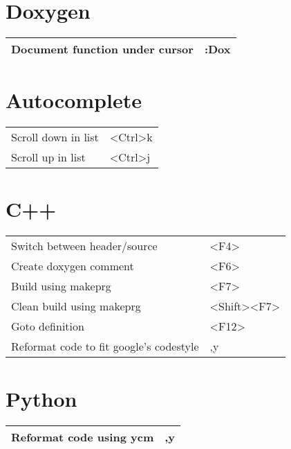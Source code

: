 \documentclass[a4paper]{report}
\def \tablewidth {10cm}
\begin{document}
\section{Doxygen}
\begin{tabularx}{\tablewidth}{| X | l |}
  \hline
  Document function under cursor & :Dox \\
  \hline
\end{tabularx}

\section{Autocomplete}
\begin{tabularx}{\tablewidth}{| X | l |}
  \hline
  Scroll down in list & \textless Ctrl\textgreater k \\
  Scroll up in list & \textless Ctrl\textgreater j \\
  \hline
\end{tabularx}

\section{C++}
\begin{tabularx}{\tablewidth}{| X | l |}
  \hline
  Switch between header/source & \textless F4\textgreater \\
  Create doxygen comment & \textless F6\textgreater \\
  Build using makeprg & \textless F7\textgreater \\
  Clean build using makeprg & \textless Shift\textgreater \textless F7\textgreater \\
  Goto definition & \textless F12\textgreater \\
  Reformat code to fit google's codestyle & ,y \\
  \hline
\end{tabularx}

\section{Python}
\begin{tabularx}{\tablewidth}{| X | l |}
  \hline
  Reformat code using ycm & ,y \\
  \hline
\end{tabularx}
\end{document}
